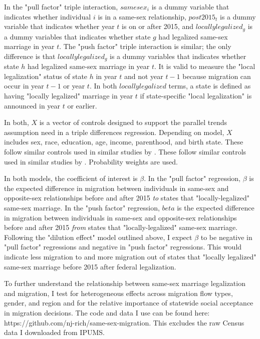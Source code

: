 \documentclass[12pt,letterpaper]{article}
\begin{document}
In the "pull factor" triple interaction, $samesex_i$ is a dummy variable that indicates whether individual $i$ is in a same-sex relationship, $post2015_t$ is a dummy variable that indicates whether year $t$ is on or after 2015, and $locally legalized_g$ is a dummy variables that indicates whether state $g$ had legalized same-sex marriage in year $t$. The "push factor" triple interaction is similar; the only difference is that $locally legalized_g$ is a dummy variables that indicates whether state $h$ had legalized same-sex marriage in year $t$. It is valid to measure the "local legalization" status of state $h$ in year $t$ and not year $t-1$ because migration can occur in year $t-1$ or year $t$. In both $locally legalized$ terms, a state is defined as having "locally legalized" marriage in year $t$ if state-specific "local legalization" is announced in year $t$ or earlier.

 In both, $X$ is a vector of controls designed to support the parallel trends assumption need in a triple differences regression. Depending on model, $X$ includes sex, race, education, age, income, parenthood, and birth state. These follow similar controls used in similar studies by \citet{1, 3, 5, 7, 12}. These follow similar controls used in similar studies by \citet{1, 3, 5, 7, 12}. Probability weights are used.

In both models, the coefficient of interest is $\beta$. In the "pull factor" regression, $\beta$ is the expected difference in migration between individuals in same-sex and opposite-sex relationships before and after 2015 \textit{to} states that "locally-legalized" same-sex marriage. In the "push factor" regression, $beta$ is the expected difference in migration between individuals in same-sex and opposite-sex relationships before and after 2015 \textit{from} states that "locally-legalized" same-sex marriage. Following the "dilution effect" model outlined above, I expect $\beta$ to be negative in "pull factor" regressions and negative in "push factor" regressions. This would indicate less migration to and more migration out of states that "locally legalized" same-sex marriage before 2015 after federal legalization.

To further understand the relationship between same-sex marriage legalization and migration, I test for heterogeneous effects across migration flow types, gender, and region and for the relative importance of statewide social acceptance in migration decisions. The code and data I use can be found here: https://github.com/nj-rich/same-sex-migration. This excludes the raw Census data I downloaded from IPUMS.
\end{document}
